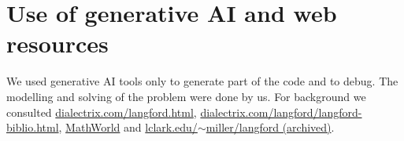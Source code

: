 \documentclass[10pt,a4paper]{article}
\begin{document}
\section{Use of generative AI and web resources}
We used generative AI tools only to generate part of the code and to debug. The modelling and solving of the problem were done by us. For background we consulted \href{https://www.dialectrix.com/langford.html}{dialectrix.com/langford.html}, \href{https://www.dialectrix.com/langford/langford-biblio.html}{dialectrix.com/langford/langford-biblio.html}, \href{https://mathworld.wolfram.com/LangfordsProblem.html}{MathWorld} and \href{https://web.archive.org/web/19991002120421/http://www.lclark.edu/~miller/langford/MG.html}{lclark.edu/$\sim$miller/langford (archived)}.
\end{document}

